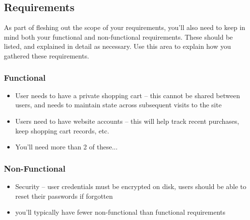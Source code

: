 \documentclass[10pt,conference,onecolumn,compsoc]{IEEEtran}
\begin{document}


\pagebreak
\subsection{Requirements}
As part of fleshing out the scope of your requirements, you'll also need to keep in mind both your functional and non-functional requirements.  These should be listed, and explained in detail as necessary.  Use this area to explain how you gathered these requirements.

\subsubsection{Functional}
\begin{itemize}
\item User needs to have a private shopping cart -- this cannot be shared between users, and needs to maintain state across subsequent visits to the site
\item Users need to have website accounts -- this will help track recent purchases, keep shopping cart records, etc.
\item You'll need more than 2 of these...
\end{itemize}

\subsubsection{Non-Functional}
\begin{itemize}
\item Security -- user credentials must be encrypted on disk, users should be able to reset their passwords if forgotten
\item you'll typically have fewer non-functional than functional requirements
\end{itemize}
\end{document}
